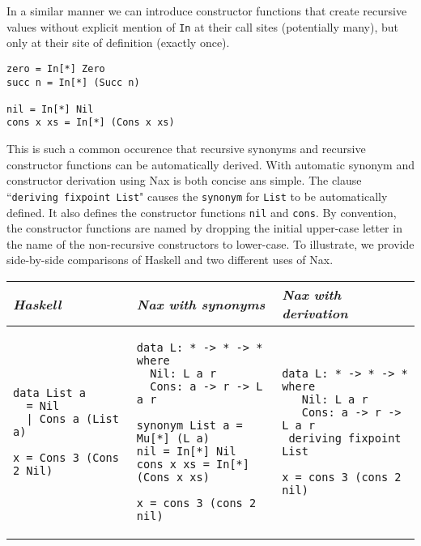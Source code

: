 In a similar manner we can introduce constructor functions that create
recursive values without explicit mention of \verb+In+ at their
call sites (potentially many), but only at their site of definition (exactly once).

{\small
\begin{verbatim}
zero = In[*] Zero
succ n = In[*] (Succ n)

nil = In[*] Nil
cons x xs = In[*] (Cons x xs)
\end{verbatim}}
This is such a common occurence that recursive synonyms and recursive constructor functions
can be automatically derived. With automatic synonym and constructor derivation
using Nax is both concise ans simple. The clause ``\verb+deriving fixpoint List+"
causes the \verb+synonym+ for \verb+List+ to be automatically defined. It
also defines the constructor functions \verb+nil+ and \verb+cons+.
By convention, the constructor functions are named by dropping the initial
upper-case letter in the name of the non-recursive constructors to lower-case.
To illustrate, we provide side-by-side comparisons
of Haskell and two different uses of Nax.

\vspace*{0.1in}
\begin{tabular}{l|l|l}
{\em Haskell}  & {\em Nax with synonyms} &  {\em Nax with derivation} \\ \hline
\begin{minipage}[t]{.26\linewidth}
{\small
\begin{verbatim}
data List a 
  = Nil 
  | Cons a (List a)
  
x = Cons 3 (Cons 2 Nil)  
\end{verbatim}}
\end{minipage}

& 

\begin{minipage}[t]{.34\linewidth}
{\small
\begin{verbatim}
data L: * -> * -> * where
  Nil: L a r
  Cons: a -> r -> L a r
  
synonym List a = Mu[*] (L a)
nil = In[*] Nil
cons x xs = In[*] (Cons x xs)

x = cons 3 (cons 2 nil)  
\end{verbatim}}
\end{minipage}

&

\begin{minipage}[t]{.26\linewidth}
{\small
\begin{verbatim}
data L: * -> * -> * where
   Nil: L a r
   Cons: a -> r -> L a r
 deriving fixpoint List

x = cons 3 (cons 2 nil)    
\end{verbatim}}
\end{minipage}

\end{tabular}


